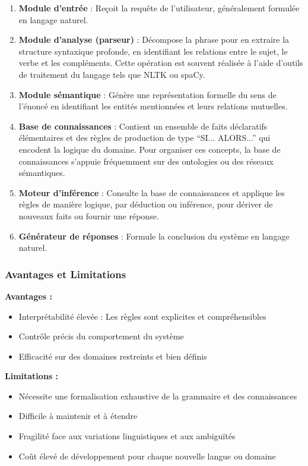 \begin{enumerate}
    \item \textbf{Module d'entrée} : Reçoit la requête de l'utilisateur, généralement formulée en langage naturel.
    
    \item \textbf{Module d'analyse (parseur)} : Décompose la phrase pour en extraire la structure syntaxique profonde, en identifiant les relations entre le sujet, le verbe et les compléments. Cette opération est souvent réalisée à l'aide d'outils de traitement du langage tels que NLTK ou spaCy.
    
    \item \textbf{Module sémantique} : Génère une représentation formelle du sens de l'énoncé en identifiant les entités mentionnées et leurs relations mutuelles.
    
    \item \textbf{Base de connaissances} : Contient un ensemble de faits déclaratifs élémentaires et des règles de production de type \enquote{SI... ALORS...} qui encodent la logique du domaine. Pour organiser ces concepts, la base de connaissances s'appuie fréquemment sur des ontologies ou des réseaux sémantiques.
    
    \item \textbf{Moteur d'inférence} : Consulte la base de connaissances et applique les règles de manière logique, par déduction ou inférence, pour dériver de nouveaux faits ou fournir une réponse.
    
    \item \textbf{Générateur de réponses} : Formule la conclusion du système en langage naturel.
\end{enumerate}

\subsubsection{Avantages et Limitations}

\textbf{Avantages :}
\begin{itemize}
    \item Interprétabilité élevée : Les règles sont explicites et compréhensibles
    \item Contrôle précis du comportement du système
    \item Efficacité sur des domaines restreints et bien définis
\end{itemize}

\textbf{Limitations :}
\begin{itemize}
    \item Nécessite une formalisation exhaustive de la grammaire et des connaissances
    \item Difficile à maintenir et à étendre
    \item Fragilité face aux variations linguistiques et aux ambiguïtés
    \item Coût élevé de développement pour chaque nouvelle langue ou domaine
\end{itemize}


